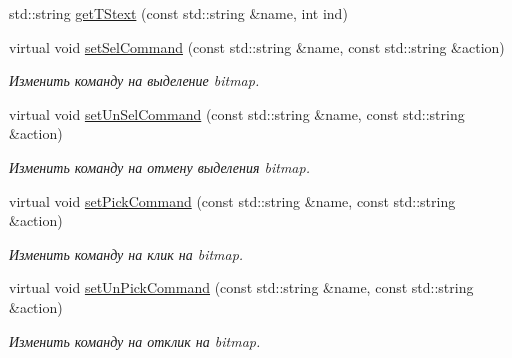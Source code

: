 \begin{DoxyCompactItemize}
std\+::string \hyperlink{class_interface_element_class_aef459140ce6fc4cfcf0b6fd017e73617}{get\+T\+Stext} (const std\+::string \&name, int ind)
\item 
virtual void \hyperlink{class_interface_element_class_a0e55bb0f0037715b19c29ce05a57abdc}{set\+Sel\+Command} (const std\+::string \&name, const std\+::string \&action)
\begin{DoxyCompactList}\small\item\em Изменить команду на выделение bitmap. \end{DoxyCompactList}\item 
virtual void \hyperlink{class_interface_element_class_ac327534caba198bf3347e1513cfe8491}{set\+Un\+Sel\+Command} (const std\+::string \&name, const std\+::string \&action)
\begin{DoxyCompactList}\small\item\em Изменить команду на отмену выделения bitmap. \end{DoxyCompactList}\item 
virtual void \hyperlink{class_interface_element_class_a866babb9cc309763567529771467fb76}{set\+Pick\+Command} (const std\+::string \&name, const std\+::string \&action)
\begin{DoxyCompactList}\small\item\em Изменить команду на клик на bitmap. \end{DoxyCompactList}\item 
virtual void \hyperlink{class_interface_element_class_a3823d61803f374b60458c9e8a7ff1505}{set\+Un\+Pick\+Command} (const std\+::string \&name, const std\+::string \&action)
\begin{DoxyCompactList}\small\item\em Изменить команду на отклик на bitmap. \end{DoxyCompactList}\end{DoxyCompactItemize}
